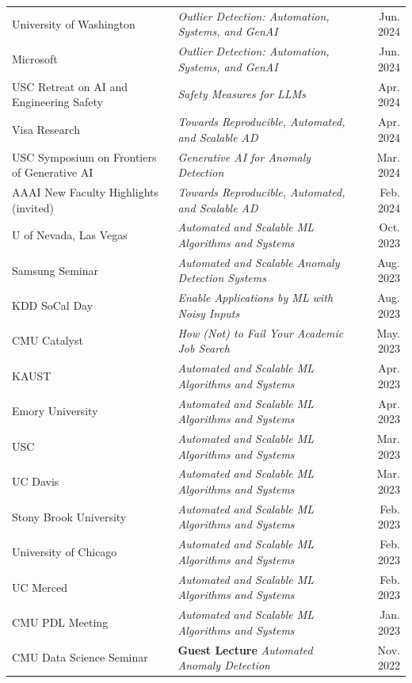 \documentclass[margin,line,pifont,palatino,courier]{res}
\begin{document}
\begin{resume}
\begin{tabularx}{\textwidth}{@{}p{1.6in}Xr@{}}
University of Washington & \textit{Outlier Detection: Automation, Systems, and GenAI} & \hfill Jun. 2024 \\
Microsoft & \textit{Outlier Detection: Automation, Systems, and GenAI} & \hfill Jun. 2024 \\
USC Retreat on AI and Engineering Safety & \textit{Safety Measures for LLMs} & \hfill Apr. 2024 \\
Visa Research & \textit{Towards Reproducible, Automated, and Scalable AD} & \hfill Apr. 2024 \\
USC Symposium on Frontiers of Generative AI & \textit{Generative AI for Anomaly Detection} & \hfill Mar. 2024 \\
AAAI New Faculty Highlights (invited)  & \textit{Towards Reproducible, Automated, and Scalable AD} & \hfill Feb. 2024 \\
U of Nevada, Las Vegas  & \textit{Automated and Scalable ML Algorithms and Systems} & \hfill Oct. 2023 \\
Samsung Seminar & \textit{Automated and Scalable Anomaly Detection Systems} & \hfill Aug. 2023 \\
KDD SoCal Day & \textit{Enable Applications by ML with Noisy Inputs} & \hfill Aug. 2023 \\
CMU Catalyst  & \textit{How (Not) to Fail Your Academic Job Search} & \hfill May. 2023 \\
KAUST & \textit{Automated and Scalable ML Algorithms and Systems} & \hfill Apr. 2023 \\
Emory University & \textit{Automated and Scalable ML Algorithms and Systems} & \hfill Apr. 2023 \\
USC & \textit{Automated and Scalable ML Algorithms and Systems} & \hfill Mar. 2023 \\
UC Davis & \textit{Automated and Scalable ML Algorithms and Systems} & \hfill Mar. 2023 \\
Stony Brook University & \textit{Automated and Scalable ML Algorithms and Systems} & \hfill Feb. 2023 \\
University of Chicago & \textit{Automated and Scalable ML Algorithms and Systems} & \hfill Feb. 2023 \\
UC Merced & \textit{Automated and Scalable ML Algorithms and Systems} & \hfill Feb. 2023 \\
CMU PDL Meeting & \textit{Automated and Scalable ML Algorithms and Systems} & \hfill Jan. 2023 \\
CMU Data Science Seminar & \textbf{Guest Lecture} \textit{Automated Anomaly Detection} & \hfill Nov. 2022 \\

\end{tabularx}
\end{resume}
\end{document}

